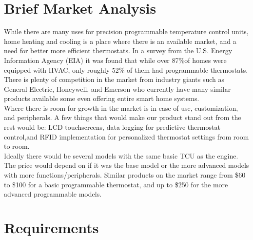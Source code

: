 \documentclass[11pt]{article}
\begin{document}
\pagebreak

\section*{Brief Market Analysis} 

While there are many uses for precision programmable temperature control units, home heating and cooling is a place where there is an available market, and a need for better more efficient thermostats. In a survey from the U.S. Energy Information Agency (EIA) it was found that while over 87$\%$of homes were equipped with HVAC, only roughly 52$\%$ of them had programmable thermostats. There is plenty of competition in the market from industry giants such as General Electric, Honeywell, and Emerson who currently have many similar products available some even offering entire smart home systems.\\

Where there is room for growth in the market is in ease of use, customization, and peripherals. A few things that would make our product stand out from the rest would be: LCD touchscreens, data logging for predictive thermostat control,and RFID implementation for personalized thermostat settings from room to room.\\

Ideally there would be several models with the same basic TCU as the engine. The price would depend on if it was the base model or the more advanced models with more functions/peripherals. Similar products on the market range from \$60 to \$100 for a basic programmable thermostat, and up to \$250 for the more advanced programmable models.\\


\section*{Requirements}
\end{document}
